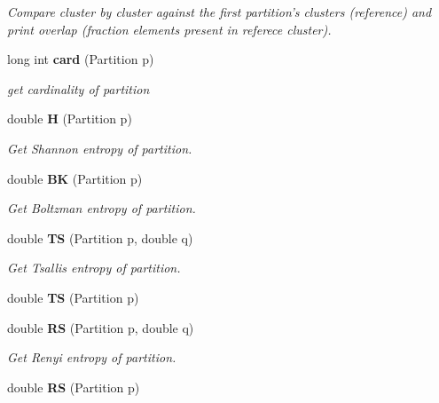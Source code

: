 \begin{CompactItemize}
\begin{CompactList}\small\item\em Compare cluster by cluster against the first partition's clusters (reference) and print overlap (fraction elements present in referece cluster). \item\end{CompactList}\item 
long int {\bf card} (Partition p)\label{classPartitionStats_a23}

\begin{CompactList}\small\item\em get cardinality of partition \item\end{CompactList}\item 
double {\bf H} (Partition p)\label{classPartitionStats_a24}

\begin{CompactList}\small\item\em Get Shannon entropy of partition. \item\end{CompactList}\item 
double {\bf BK} (Partition p)\label{classPartitionStats_a25}

\begin{CompactList}\small\item\em Get Boltzman entropy of partition. \item\end{CompactList}\item 
double {\bf TS} (Partition p, double q)\label{classPartitionStats_a26}

\begin{CompactList}\small\item\em Get Tsallis entropy of partition. \item\end{CompactList}\item 
double {\bf TS} (Partition p)\label{classPartitionStats_a27}

\item 
double {\bf RS} (Partition p, double q)\label{classPartitionStats_a28}

\begin{CompactList}\small\item\em Get Renyi entropy of partition. \item\end{CompactList}\item 
double {\bf RS} (Partition p)\label{classPartitionStats_a29}


\end{CompactItemize}

